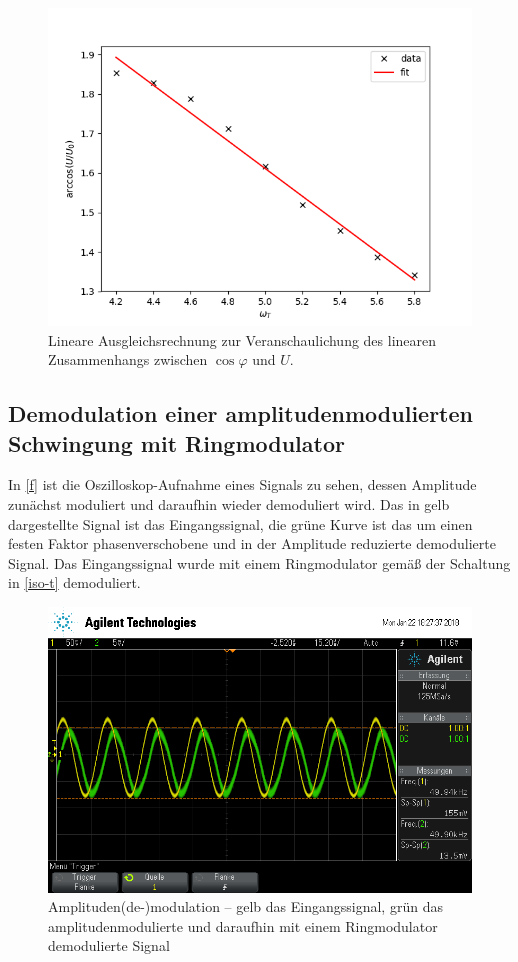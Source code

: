 \begin{figure}
	\centering
	\includegraphics[width=\textwidth]{img/linear_fit.png}
	\caption{Lineare Ausgleichsrechnung zur Veranschaulichung des linearen Zusammenhangs zwischen $\cos\varphi$ und $U$.}
	\label{fig:e}
\end{figure}

\subsection{Demodulation einer amplitudenmodulierten Schwingung mit Ringmodulator}

In \autoref{f} ist die Oszilloskop-Aufnahme eines Signals zu sehen, dessen Amplitude zunächst moduliert und daraufhin wieder demoduliert wird. Das in gelb dargestellte Signal ist das Eingangssignal, die grüne Kurve ist das um einen festen Faktor phasenverschobene und in der Amplitude reduzierte demodulierte Signal. Das Eingangssignal wurde mit einem Ringmodulator gemäß der Schaltung in \autoref{iso-t} demoduliert.

\begin{figure}
	\centering
	\includegraphics[width=\textwidth]{img/f_scope_235.png}
	\caption{Amplituden(de-)modulation -- gelb das Eingangssignal, grün das amplitudenmodulierte und daraufhin mit einem Ringmodulator demodulierte Signal}
	\label{f}
\end{figure}


